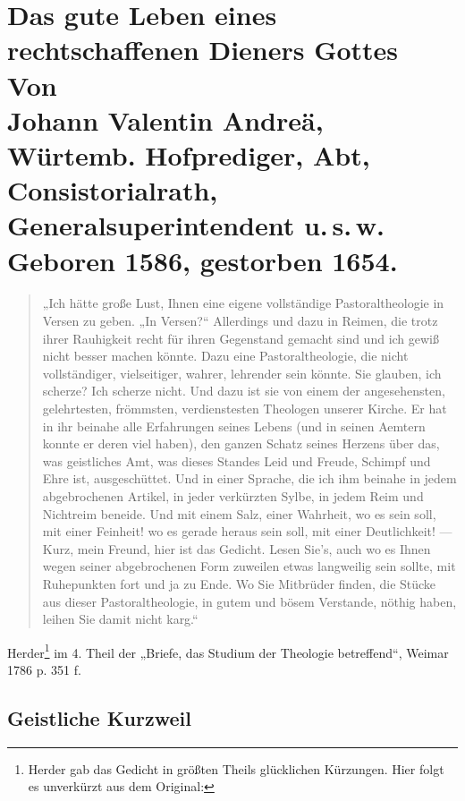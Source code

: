 \mainmatter
{}
\part[Das gute Leben eines rechtschaffenen Dieners Gottes]{Das gute Leben eines rechtschaffenen Dieners Gottes\\[1em]\normalsize Von\\ Johann Valentin Andreä,\\[1em] Würtemb. Hofprediger, Abt, Consistorialrath, Generalsuperintendent u.\,s.\,w.\\[1em] Geboren 1586, gestorben 1654.}

\begin{quote}
„Ich hätte große Lust, Ihnen eine eigene vollständige Pastoraltheologie in Versen zu geben. „In Versen?“ Allerdings und dazu in Reimen, die trotz ihrer Rauhigkeit recht für ihren Gegenstand gemacht sind und ich gewiß nicht besser machen könnte. Dazu eine Pastoraltheologie, die nicht vollständiger, vielseitiger, wahrer, lehrender sein könnte. Sie glauben, ich scherze? Ich scherze nicht. Und dazu ist sie von einem der angesehensten, gelehrtesten, frömmsten, verdienstesten Theologen unserer Kirche. Er hat in ihr beinahe alle Erfahrungen seines Lebens (und in seinen Aemtern konnte er deren viel haben), den ganzen Schatz seines Herzens über das, was geistliches Amt, was dieses Standes Leid und Freude, Schimpf und Ehre ist, ausgeschüttet. Und in einer Sprache, die ich ihm beinahe in jedem abgebrochenen Artikel, in jeder verkürzten Sylbe, in jedem Reim und Nichtreim beneide. Und mit einem Salz, einer Wahrheit, wo es sein soll, mit einer Feinheit! wo es gerade heraus sein soll, mit einer Deutlichkeit! — Kurz, mein Freund, hier ist das Gedicht. Lesen Sie’s, auch wo es Ihnen wegen seiner abgebrochenen Form zuweilen etwas langweilig sein sollte, mit Ruhepunkten fort und ja zu Ende. Wo Sie Mitbrüder finden, die Stücke aus dieser Pastoraltheologie, in gutem und bösem Verstande, nöthig haben, leihen Sie damit nicht karg.“
\end{quote}

Herder\footnote{Herder gab das Gedicht in größten Theils glücklichen Kürzungen. Hier folgt es unverkürzt aus dem Original:} im 4. Theil der „Briefe, das Studium der Theologie betreffend“, Weimar 1786 p. 351 f.

\chapter{Geistliche Kurzweil}

